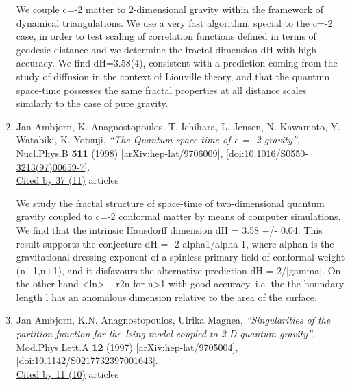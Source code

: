 \documentclass[a4paper,10pt]{article}
\begin{document}
\begin{enumerate}
We couple c=-2 matter to 2-dimensional gravity within the framework of dynamical triangulations. We use a very fast algorithm, special to the c=-2 case, in order to test scaling of correlation functions defined in terms of geodesic distance and we determine the fractal dimension dH with high accuracy. We find dH=3.58(4), consistent with a prediction coming from the study of diffusion in the context of Liouville theory, and that the quantum space-time possesses the same fractal properties at all distance scales similarly to the case of pure gravity.
\item Jan Ambjorn, K. Anagnostopoulos, T. Ichihara, L. Jensen, N. Kawamoto, Y. Watabiki, K. Yotsuji, {\it ``The Quantum space-time of c = -2 gravity''}, \href{https://www.doi.org/10.1016/S0550-3213(97)00659-7}{Nucl.Phys.B {\bf 511} (1998) } \href{https://arxiv.org/abs/hep-lat/9706009}{[arXiv:hep-lat/9706009]}, \href{https://www.doi.org/10.1016/S0550-3213(97)00659-7}{[doi:10.1016/S0550-3213(97)00659-7]}.
\\\href{https://inspirehep.net/literature/?q=refersto%3Arecid%3A444077}{Cited by 37 (11)} articles

We study the fractal structure of space-time of two-dimensional quantum gravity coupled to c=-2 conformal matter by means of computer simulations. We find that the intrinsic Hausdorff dimension dH = 3.58 +/- 0.04. This result supports the conjecture dH = -2 alpha1/alpha{-1}, where alphan is the gravitational dressing exponent of a spinless primary field of conformal weight (n+1,n+1), and it disfavours the alternative prediction dH = 2/|gamma|. On the other hand <ln> ~ r{2n} for n>1 with good accuracy, i.e. the the boundary length l has an anomalous dimension relative to the area of the surface.
\item Jan Ambjorn, K.N. Anagnostopoulos, Ulrika Magnea, {\it ``Singularities of the partition function for the Ising model coupled to 2-D quantum gravity''}, \href{https://www.doi.org/10.1142/S0217732397001643}{Mod.Phys.Lett.A {\bf 12} (1997) } \href{https://arxiv.org/abs/hep-lat/9705004}{[arXiv:hep-lat/9705004]}, \href{https://www.doi.org/10.1142/S0217732397001643}{[doi:10.1142/S0217732397001643]}.
\\\href{https://inspirehep.net/literature/?q=refersto%3Arecid%3A442748}{Cited by 11 (10)} articles


\end{enumerate}
\end{document}
